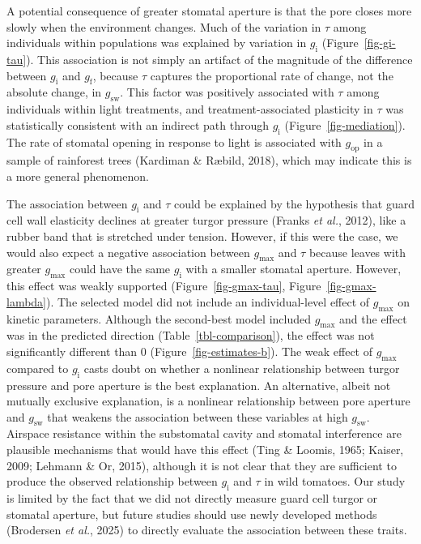 \documentclass[
  letterpaper,
  DIV=11,
  numbers=noendperiod]{scrartcl}
\newcommand{\gi}{$g_\mathrm{i}$}
\newcommand{\gf}{$g_\mathrm{f}$}
\newcommand{\gmax}{$g_\mathrm{max}$}
\newcommand{\gop}{$g_\mathrm{op}$}
\newcommand{\gsw}{$g_\mathrm{sw}$}
\begin{document}
A potential consequence of greater stomatal aperture is that the pore
closes more slowly when the environment changes. Much of the variation
in \(\tau\) among individuals within populations was explained by
variation in \gi{} (Figure~\ref{fig-gi-tau}). This association is not
simply an artifact of the magnitude of the difference between \gi{} and
\gf{}, because \(\tau\) captures the proportional rate of change, not
the absolute change, in \gsw. This factor was positively associated with
\(\tau\) among individuals within light treatments, and
treatment-associated plasticity in \(\tau\) was statistically consistent
with an indirect path through \gi{} (Figure~\ref{fig-mediation}). The
rate of stomatal opening in response to light is associated with \gop{}
in a sample of rainforest trees (Kardiman \& Ræbild, 2018), which may
indicate this is a more general phenomenon.

The association between \gi{} and \(\tau\) could be explained by the
hypothesis that guard cell wall elasticity declines at greater turgor
pressure (Franks \emph{et al.}, 2012), like a rubber band that is
stretched under tension. However, if this were the case, we would also
expect a negative association between \gmax{} and \(\tau\) because
leaves with greater \gmax{} could have the same \gi{} with a smaller
stomatal aperture. However, this effect was weakly supported
(Figure~\ref{fig-gmax-tau}, Figure~\ref{fig-gmax-lambda}). The selected
model did not include an individual-level effect of \gmax{} on kinetic
parameters. Although the second-best model included \gmax{} and the
effect was in the predicted direction (Table~\ref{tbl-comparison}), the
effect was not significantly different than 0
(Figure~\ref{fig-estimates-b}). The weak effect of \gmax{} compared to
\gi{} casts doubt on whether a nonlinear relationship between turgor
pressure and pore aperture is the best explanation. An alternative,
albeit not mutually exclusive explanation, is a nonlinear relationship
between pore aperture and \gsw{} that weakens the association between
these variables at high \gsw. Airspace resistance within the substomatal
cavity and stomatal interference are plausible mechanisms that would
have this effect (Ting \& Loomis, 1965; Kaiser, 2009; Lehmann \& Or,
2015), although it is not clear that they are sufficient to produce the
observed relationship between \gi{} and \(\tau\) in wild tomatoes. Our
study is limited by the fact that we did not directly measure guard cell
turgor or stomatal aperture, but future studies should use newly
developed methods (Brodersen \emph{et al.}, 2025) to directly evaluate
the association between these traits.
\end{document}
